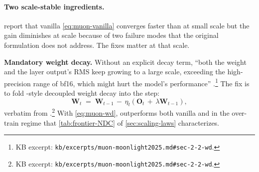 \paragraph{Two scale-stable ingredients.}
\citet[\S 2.2]{muon-moonlight2025} report that vanilla
\cref{eq:muon-vanilla} converges faster than  at small scale but
the gain diminishes at  scale because of two failure modes that
the original formulation does not address. The fixes matter at
that scale.

\textbf{Mandatory weight decay.} Without an explicit decay term,
``both the weight and the layer output's RMS keep growing to a large
scale, exceeding the high-precision range of bf16, which might hurt
the model's performance''
\citep[\S 2.2]{muon-moonlight2025}.\footnote{KB excerpt:
\nolinkurl{kb/excerpts/muon-moonlight2025.md#sec-2-2-wd}.} The fix is
to fold -style decoupled weight decay into the  step:
\begin{equation}
\mathbf{W}_t \;=\; \mathbf{W}_{t-1} \,-\, \eta_t \!\left(
   \mathbf{O}_t \,+\, \lambda \mathbf{W}_{t-1}
\right),
\label{eq:muon-wd}
\end{equation}
verbatim from \citet[\S 2.2, eq.\ 3]{muon-moonlight2025}.\footnote{KB
excerpt: \nolinkurl{kb/excerpts/muon-moonlight2025.md#sec-2-2-wd}.}
With \cref{eq:muon-wd},  outperforms both vanilla  and 
in the over-train regime that \cref{tab:frontier-NDC} of
\cref{sec:scaling-laws} characterizes.

